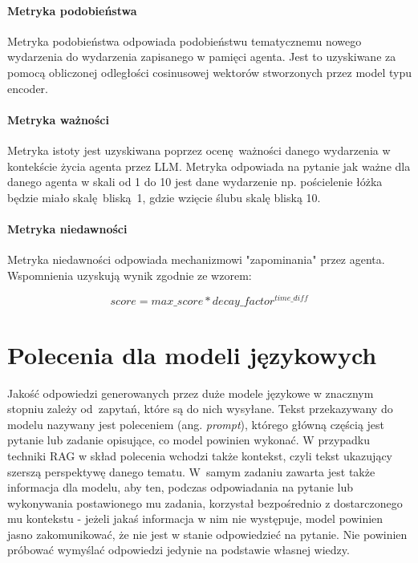 \paragraph{Metryka podobieństwa}
Metryka podobieństwa odpowiada podobieństwu tematycznemu nowego wydarzenia do
wydarzenia zapisanego w pamięci agenta. Jest to uzyskiwane za pomocą obliczonej
odległości cosinusowej wektorów stworzonych przez model typu encoder.

\paragraph{Metryka ważności}
Metryka istoty jest uzyskiwana
poprzez ocenę ważności danego wydarzenia w kontekście życia agenta przez LLM.
Metryka odpowiada na pytanie jak ważne dla danego agenta w skali od 1 do 10 jest
dane wydarzenie np. pościelenie łóżka będzie miało skalę bliską 1, gdzie wzięcie
ślubu skalę bliską 10.

\paragraph{Metryka niedawności}
Metryka niedawności odpowiada mechanizmowi "zapominania" przez agenta.
Wspomnienia uzyskują wynik zgodnie ze wzorem:

\begin{equation}
	score = max\_score * decay\_factor ^ {time\_diff}
\end{equation}




\section{Polecenia dla modeli językowych}

Jakość odpowiedzi generowanych przez duże modele językowe w znacznym stopniu zależy od~zapytań, które są do nich wysyłane. Tekst przekazywany do modelu nazywany jest poleceniem (ang. \textit{prompt}), którego główną częścią jest pytanie lub zadanie opisujące, co model powinien wykonać. W przypadku techniki RAG w skład polecenia wchodzi także kontekst, czyli tekst ukazujący szerszą perspektywę danego tematu. W~samym zadaniu zawarta jest także informacja dla modelu, aby ten, podczas odpowiadania na pytanie lub wykonywania postawionego mu zadania, korzystał bezpośrednio z dostarczonego mu kontekstu - jeżeli jakaś informacja w nim nie występuje, model powinien jasno zakomunikować, że nie jest w stanie odpowiedzieć na pytanie. Nie powinien próbować wymyślać odpowiedzi jedynie na podstawie własnej wiedzy.

